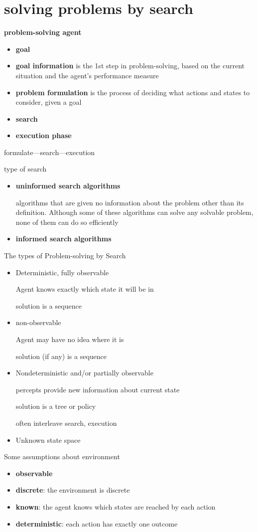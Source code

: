 \documentclass[11pt]{article}
\begin{document}
\section{solving problems by search}
\label{sec:org2337cbb}
\textbf{problem-solving agent}
\begin{itemize}
\item \textbf{goal}
\item \textbf{goal information} is the 1st step in problem-solving, based on the
current situation and the agent’s performance measure
\item \textbf{problem formulation} is the process of deciding what actions and
states to consider, given a goal
\item \textbf{search}
\item \textbf{execution phase}
\end{itemize}


formulate—search—execution


type of search
\begin{itemize}
\item \textbf{uninformed search algorithms}

algorithms that are given no information about the problem other
than its definition. Although some of these algorithms can solve
any solvable problem, none of them can do so efficiently
\item \textbf{informed search algorithms}
\end{itemize}


The types of Problem-solving by Search
\begin{itemize}
\item Deterministic, fully observable

Agent knows exactly which state it will be in

solution is a sequence
\item non-observable

Agent may have no idea where it is

solution (if any) is a sequence
\item Nondeterministic and/or partially observable

percepts provide new information about current state

solution is a tree or policy

often interleave search, execution
\item Unknown state space
\end{itemize}


Some assumptions about environment
\begin{itemize}
\item \textbf{observable}
\item \textbf{discrete}: the environment is discrete
\item \textbf{known}: the agent knows which states are reached by each action
\item \textbf{deterministic}: each action has exactly one outcome
\end{itemize}
\end{document}
